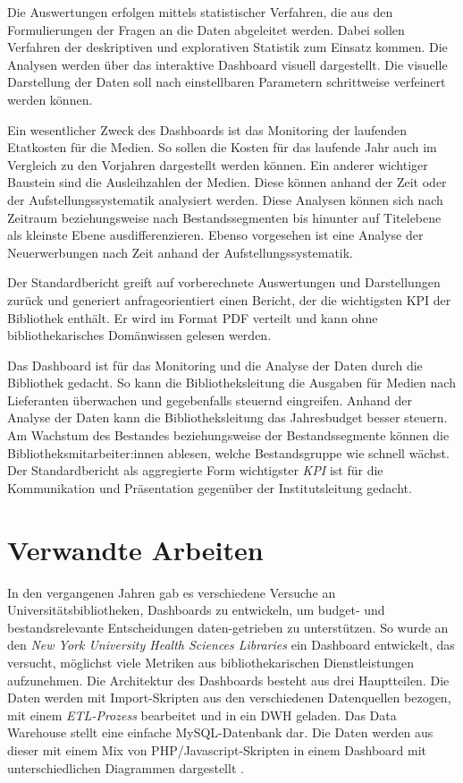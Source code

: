 Die Auswertungen erfolgen mittels statistischer Verfahren, 
die aus den Formulierungen der Fragen an die Daten abgeleitet werden. Dabei sollen Verfahren der deskriptiven und explorativen Statistik zum Einsatz kommen.
Die Analysen werden über das interaktive Dashboard visuell dargestellt.
Die visuelle Darstellung der Daten soll nach einstellbaren Parametern schrittweise verfeinert werden können.

Ein wesentlicher Zweck des Dashboards ist das Monitoring der laufenden Etatkosten für die Medien. So sollen die Kosten für das laufende Jahr auch im Vergleich zu den
Vorjahren dargestellt werden können. Ein anderer wichtiger Baustein sind die Ausleihzahlen der Medien. Diese können
anhand der Zeit oder der Aufstellungssystematik analysiert werden. Diese Analysen können sich 
nach Zeitraum beziehungsweise nach Bestandssegmenten bis hinunter auf Titelebene als kleinste Ebene ausdifferenzieren. 
Ebenso vorgesehen ist eine Analyse der Neuerwerbungen nach Zeit anhand der Aufstellungssystematik.

Der Standardbericht greift auf vorberechnete Auswertungen und Darstellungen zurück und generiert anfrageorientiert einen Bericht, der die wichtigsten 
\acrfull{KPI} der Bibliothek enthält. Er wird im Format PDF verteilt und kann ohne bibliothekarisches Domänwissen gelesen werden.

Das Dashboard ist für das Monitoring und die Analyse der Daten durch die Bibliothek gedacht. 
So kann die Bibliotheksleitung die Ausgaben für Medien nach Lieferanten überwachen und gegebenfalls steuernd eingreifen.
Anhand der Analyse der Daten kann die Bibliotheksleitung das Jahresbudget besser steuern.
Am Wachstum des Bestandes beziehungsweise der Bestandssegmente können die Bibliotheksmitarbeiter:innen ablesen, welche Bestandsgruppe
wie schnell wächst.
Der Standardbericht als aggregierte Form wichtigster \textit{\acrshort{KPI}} ist für die Kommunikation und Präsentation gegenüber der Institutsleitung gedacht.



\section{Verwandte Arbeiten}
In den vergangenen Jahren gab es verschiedene Versuche an Universitätsbibliotheken, Dashboards zu entwickeln, um budget- und bestandsrelevante Entscheidungen daten-getrieben zu unterstützen.
So wurde an den \textit{New York University Health Sciences Libraries} ein Dashboard entwickelt, das versucht, möglichst viele Metriken
aus bibliothekarischen Dienstleistungen aufzunehmen. Die Architektur des Dashboards besteht aus drei Hauptteilen. Die Daten werden mit 
Import-Skripten aus den verschiedenen Datenquellen bezogen, mit einem \textit{\acrshort{ETL}-Prozess} bearbeitet und in ein \acrfull{DWH} geladen. Das Data Warehouse 
stellt eine einfache MySQL-Datenbank dar. Die Daten werden aus dieser mit einem Mix von PHP/Javascript-Skripten in einem Dashboard mit unterschiedlichen Diagrammen
dargestellt \cite[vgl.][S. 38 f.]{morton-owens_trends_2012}.

